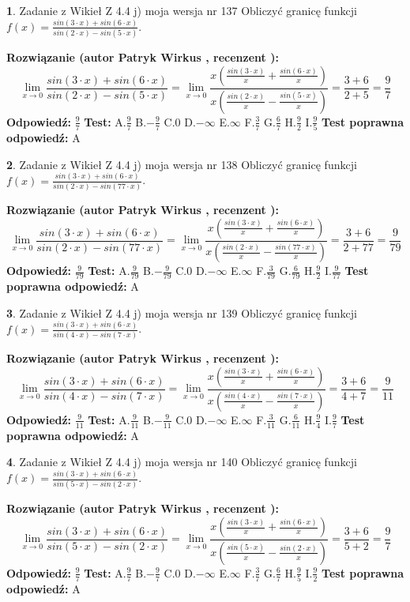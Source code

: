 \documentclass[12pt, a4paper]{article}
\theoremstyle{definition} %
\newtheorem{zad}{}
\newcommand{\zadStart}[1]{\begin{zad}#1\newline}
\newcommand{\zadStop}{\end{zad}}
\newcommand{\rozwStart}[2]{\noindent \textbf{Rozwiązanie (autor #1 , recenzent #2): }\newline}
\newcommand{\rozwStop}{\newline}
\newcommand{\odpStart}{\noindent \textbf{Odpowiedź:}\newline}
\newcommand{\odpStop}{\newline}
\newcommand{\testStart}{\noindent \textbf{Test:}\newline}
\newcommand{\testStop}{\newline}
\newcommand{\kluczStart}{\noindent \textbf{Test poprawna odpowiedź:}\newline}
\newcommand{\kluczStop}{\newline}
\begin{document}
\zadStart{Zadanie z Wikieł Z 4.4 j) moja wersja nr 137}
Obliczyć granicę funkcji $f(x)=\frac{sin(3\cdot x) +sin(6\cdot x)}{sin(2\cdot x) -sin(5\cdot x)}$.
\zadStop
\rozwStart{Patryk Wirkus}{}
$$\lim\limits_{x\to 0}\frac{sin(3\cdot x) +sin(6\cdot x)}{sin(2\cdot x) -sin(5\cdot x)}=\lim\limits_{x\to 0}\frac{x(\frac{sin(3\cdot x)}{x}+\frac{sin(6\cdot x)}{x})}{x(\frac{sin(2\cdot x)}{x}-\frac{sin(5\cdot x)}{x})}=\frac{3+6}{2+5} = \frac{9}{7}$$
\rozwStop
\odpStart
$\frac{9}{7}$
\odpStop
\testStart
A.$\frac{9}{7}$
B.$-\frac{9}{7}$
C.$0$
D.$-\infty$
E.$\infty$
F.$\frac{3}{7}$
G.$\frac{6}{7}$
H.$\frac{9}{2}$
I.$\frac{9}{5}$
\testStop
\kluczStart
A
\kluczStop



\zadStart{Zadanie z Wikieł Z 4.4 j) moja wersja nr 138}
Obliczyć granicę funkcji $f(x)=\frac{sin(3\cdot x) +sin(6\cdot x)}{sin(2\cdot x) -sin(77\cdot x)}$.
\zadStop
\rozwStart{Patryk Wirkus}{}
$$\lim\limits_{x\to 0}\frac{sin(3\cdot x) +sin(6\cdot x)}{sin(2\cdot x) -sin(77\cdot x)}=\lim\limits_{x\to 0}\frac{x(\frac{sin(3\cdot x)}{x}+\frac{sin(6\cdot x)}{x})}{x(\frac{sin(2\cdot x)}{x}-\frac{sin(77\cdot x)}{x})}=\frac{3+6}{2+77} = \frac{9}{79}$$
\rozwStop
\odpStart
$\frac{9}{79}$
\odpStop
\testStart
A.$\frac{9}{79}$
B.$-\frac{9}{79}$
C.$0$
D.$-\infty$
E.$\infty$
F.$\frac{3}{79}$
G.$\frac{6}{79}$
H.$\frac{9}{2}$
I.$\frac{9}{77}$
\testStop
\kluczStart
A
\kluczStop



\zadStart{Zadanie z Wikieł Z 4.4 j) moja wersja nr 139}
Obliczyć granicę funkcji $f(x)=\frac{sin(3\cdot x) +sin(6\cdot x)}{sin(4\cdot x) -sin(7\cdot x)}$.
\zadStop
\rozwStart{Patryk Wirkus}{}
$$\lim\limits_{x\to 0}\frac{sin(3\cdot x) +sin(6\cdot x)}{sin(4\cdot x) -sin(7\cdot x)}=\lim\limits_{x\to 0}\frac{x(\frac{sin(3\cdot x)}{x}+\frac{sin(6\cdot x)}{x})}{x(\frac{sin(4\cdot x)}{x}-\frac{sin(7\cdot x)}{x})}=\frac{3+6}{4+7} = \frac{9}{11}$$
\rozwStop
\odpStart
$\frac{9}{11}$
\odpStop
\testStart
A.$\frac{9}{11}$
B.$-\frac{9}{11}$
C.$0$
D.$-\infty$
E.$\infty$
F.$\frac{3}{11}$
G.$\frac{6}{11}$
H.$\frac{9}{4}$
I.$\frac{9}{7}$
\testStop
\kluczStart
A
\kluczStop



\zadStart{Zadanie z Wikieł Z 4.4 j) moja wersja nr 140}
Obliczyć granicę funkcji $f(x)=\frac{sin(3\cdot x) +sin(6\cdot x)}{sin(5\cdot x) -sin(2\cdot x)}$.
\zadStop
\rozwStart{Patryk Wirkus}{}
$$\lim\limits_{x\to 0}\frac{sin(3\cdot x) +sin(6\cdot x)}{sin(5\cdot x) -sin(2\cdot x)}=\lim\limits_{x\to 0}\frac{x(\frac{sin(3\cdot x)}{x}+\frac{sin(6\cdot x)}{x})}{x(\frac{sin(5\cdot x)}{x}-\frac{sin(2\cdot x)}{x})}=\frac{3+6}{5+2} = \frac{9}{7}$$
\rozwStop
\odpStart
$\frac{9}{7}$
\odpStop
\testStart
A.$\frac{9}{7}$
B.$-\frac{9}{7}$
C.$0$
D.$-\infty$
E.$\infty$
F.$\frac{3}{7}$
G.$\frac{6}{7}$
H.$\frac{9}{5}$
I.$\frac{9}{2}$
\testStop
\kluczStart
A
\kluczStop
\end{document}
